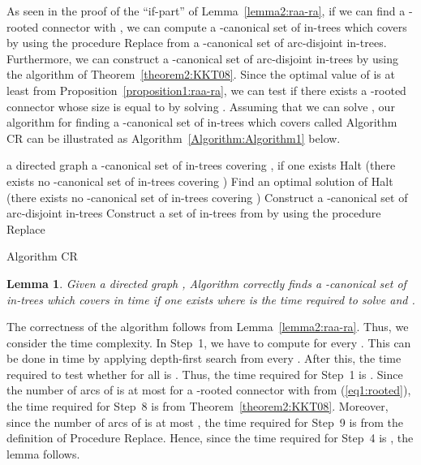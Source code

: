 \documentclass[11pt]{article}
\newcounter{ni}
\theoremstyle{plain}
\newtheorem{lemma}[theorem]{Lemma}\newtheorem{corollary}[theorem]{Corollary}\newtheorem{definition}[theorem]{Definition}\newtheorem{proposition}[theorem]{Proposition}\newtheorem{claim}[theorem]{Claim}\newtheorem{fact}[theorem]{Fact}\newtheorem{example}{Example}
\newcommand{\eop}{\hfill \usebox{\ProofSym}}
\newenvironment{proof}{\noindent {\it Proof.}}{\eop\par\vspace{0.3cm}}
\begin{document}
As seen in the proof of the ``if-part'' of Lemma~\ref{lemma2:raa-ra}, 
if we can find a -rooted connector  with , 
we can compute a -canonical set of in-trees which covers  by using the procedure 
{\sf Replace} from a -canonical set of arc-disjoint in-trees. 
Furthermore, we can construct a -canonical set of arc-disjoint in-trees by using 
the algorithm of Theorem~\ref{theorem2:KKT08}. 
Since the optimal value of  is at least  from Proposition~\ref{proposition1:raa-ra}, 
we can test if there exists a -rooted connector whose size is equal to 
by solving . 
Assuming that we can solve , 
our algorithm for finding a -canonical set of in-trees which covers 
called Algorithm {\sf CR} can be illustrated as Algorithm~\ref{Algorithm:Algorithm1} below. 

\begin{algorithm}[h]
\begin{algorithmic}[1]
\INPUT a directed graph 
\OUTPUT a -canonical set of in-trees covering , if one exists
\STATE Halt (there exists no -canonical set of in-trees covering )
\ENDIF
\STATE Find an optimal solution  of 
\IF{}
\STATE Halt (there exists no -canonical set of in-trees covering )
\ELSE
\STATE Construct a -canonical set  of arc-disjoint in-trees
\STATE Construct a set  of in-trees from  by using the procedure {\sf Replace}
\RETURN  
\ENDIF
\end{algorithmic}
\caption{Algorithm {\sf CR}}
\label{Algorithm:Algorithm1}
\end{algorithm}

\begin{lemma} \label{lemma1:computation}
Given a directed graph , Algorithm  correctly 
finds a -canonical set of in-trees which covers  in  time if one exists where 
 is the time required to solve  and 
. 
\end{lemma}
\begin{proof}
The correctness of the algorithm follows from Lemma~\ref{lemma2:raa-ra}. Thus, 
we consider the time complexity. 
In Step~1, we have to compute  for every . 
This can be done in  time by applying depth-first search from every . 
After this, the time required to test whether  for all  
is . Thus, the time required for Step~1 is . 
Since the number of arcs of  is at most  for a -rooted connector  with
 from (\ref{eq1:rooted}), the time required for Step~8 is 
from Theorem~\ref{theorem2:KKT08}. 
Moreover, since the number of arcs of  is at most , the time required for Step~9
is  from the definition of Procedure {\sf Replace}.
Hence, since the time required for Step~4 is , the lemma follows. 
\end{proof}
\end{document}
